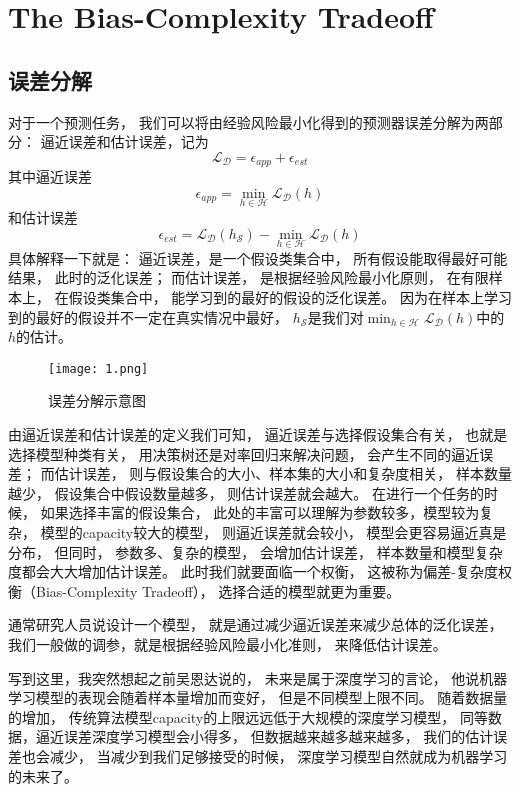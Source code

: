 \documentclass[UTF8]{ctexart}
\begin{document}
\newpage


%
%
\section{The Bias-Complexity Tradeoff}
\subsection{误差分解}
对于一个预测任务，
我们可以将由经验风险最小化得到的预测器误差分解为两部分：
逼近误差和估计误差，记为
$$
\mathcal{L}_{\mathcal{D}}=
\epsilon_{app}+\epsilon_{est}
$$
其中逼近误差
$$
\epsilon_{app}=\min_{h\in\mathcal{H}}
\mathcal{L}_{\mathcal{D}}(h)
$$
和估计误差
$$
\epsilon_{est}=
\mathcal{L}_{\mathcal{D}}(h_\mathcal{S})-
\min_{h\in\mathcal{H}}
\mathcal{L}_{\mathcal{D}}(h)
$$
具体解释一下就是：
逼近误差，是一个假设类集合中，
所有假设能取得最好可能结果，
此时的泛化误差；
而估计误差，
是根据经验风险最小化原则，
在有限样本上，
在假设类集合中，
能学习到的最好的假设的泛化误差。
因为在样本上学习到的最好的假设并不一定在真实情况中最好，
$h_\mathcal{S}$是我们对$\min_{h\in\mathcal{H}}
\mathcal{L}_{\mathcal{D}}(h)$中的$h$的估计。

\begin{figure}[htbp]
\centering
\texttt{[image: 1.png]}
\caption{误差分解示意图}
\end{figure}

由逼近误差和估计误差的定义我们可知，
逼近误差与选择假设集合有关，
也就是选择模型种类有关，
用决策树还是对率回归来解决问题，
会产生不同的逼近误差；
而估计误差，
则与假设集合的大小、样本集的大小和复杂度相关，
样本数量越少，
假设集合中假设数量越多，
则估计误差就会越大。
在进行一个任务的时候，
如果选择丰富的假设集合，
此处的丰富可以理解为参数较多，模型较为复杂，
模型的capacity较大的模型，
则逼近误差就会较小，
模型会更容易逼近真是分布，
但同时，
参数多、复杂的模型，
会增加估计误差，
样本数量和模型复杂度都会大大增加估计误差。
此时我们就要面临一个权衡，
这被称为偏差-复杂度权衡（Bias-Complexity Tradeoff），
选择合适的模型就更为重要。

通常研究人员说设计一个模型，
就是通过减少逼近误差来减少总体的泛化误差，
我们一般做的调参，就是根据经验风险最小化准则，
来降低估计误差。

写到这里，我突然想起之前吴恩达说的，
未来是属于深度学习的言论，
他说机器学习模型的表现会随着样本量增加而变好，
但是不同模型上限不同。
随着数据量的增加，
传统算法模型capacity的上限远远低于大规模的深度学习模型，
同等数据，逼近误差深度学习模型会小得多，
但数据越来越多越来越多，
我们的估计误差也会减少，
当减少到我们足够接受的时候，
深度学习模型自然就成为机器学习的未来了。
\end{document}
